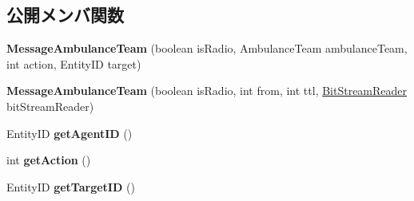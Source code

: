 \subsection*{公開メンバ関数}
\begin{DoxyCompactItemize}
\item 
\hypertarget{classadf_1_1agent_1_1communication_1_1standard_1_1bundle_1_1information_1_1MessageAmbulanceTeam_a9825be764cf5caf0d91c4a3a9d4d36c7}{}\label{classadf_1_1agent_1_1communication_1_1standard_1_1bundle_1_1information_1_1MessageAmbulanceTeam_a9825be764cf5caf0d91c4a3a9d4d36c7} 
{\bfseries Message\+Ambulance\+Team} (boolean is\+Radio, Ambulance\+Team ambulance\+Team, int action, Entity\+ID target)
\item 
\hypertarget{classadf_1_1agent_1_1communication_1_1standard_1_1bundle_1_1information_1_1MessageAmbulanceTeam_aa0a2d6e659bf3942c90429f4a3537631}{}\label{classadf_1_1agent_1_1communication_1_1standard_1_1bundle_1_1information_1_1MessageAmbulanceTeam_aa0a2d6e659bf3942c90429f4a3537631} 
{\bfseries Message\+Ambulance\+Team} (boolean is\+Radio, int from, int ttl, \hyperlink{classadf_1_1component_1_1communication_1_1util_1_1BitStreamReader}{Bit\+Stream\+Reader} bit\+Stream\+Reader)
\item 
\hypertarget{classadf_1_1agent_1_1communication_1_1standard_1_1bundle_1_1information_1_1MessageAmbulanceTeam_ad264c0793cc9cfa2fa2a4f0d20dc63f3}{}\label{classadf_1_1agent_1_1communication_1_1standard_1_1bundle_1_1information_1_1MessageAmbulanceTeam_ad264c0793cc9cfa2fa2a4f0d20dc63f3} 
Entity\+ID {\bfseries get\+Agent\+ID} ()
\item 
\hypertarget{classadf_1_1agent_1_1communication_1_1standard_1_1bundle_1_1information_1_1MessageAmbulanceTeam_aeef32ab5437e6a90671f072abc5ecc54}{}\label{classadf_1_1agent_1_1communication_1_1standard_1_1bundle_1_1information_1_1MessageAmbulanceTeam_aeef32ab5437e6a90671f072abc5ecc54} 
int {\bfseries get\+Action} ()
\item 
\hypertarget{classadf_1_1agent_1_1communication_1_1standard_1_1bundle_1_1information_1_1MessageAmbulanceTeam_abf67f2c75d8a2ddf71f1984b40314918}{}\label{classadf_1_1agent_1_1communication_1_1standard_1_1bundle_1_1information_1_1MessageAmbulanceTeam_abf67f2c75d8a2ddf71f1984b40314918} 
Entity\+ID {\bfseries get\+Target\+ID} ()
\item 
\hypertarget{classadf_1_1agent_1_1communication_1_1standard_1_1bundle_1_1information_1_1MessageAmbulanceTeam_a95588d690a0871888568e5f01c9dea5d}{}\label{classadf_1_1agent_1_1communication_1_1standard_1_1bundle_1_1information_1_1MessageAmbulanceTeam_a95588d690a0871888568e5f01c9dea5d} 

\end{DoxyCompactItemize}
